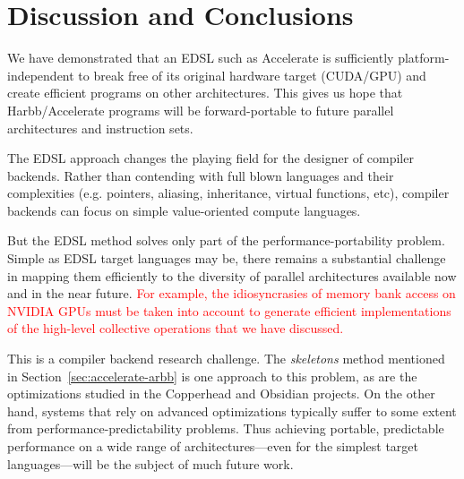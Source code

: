 \documentclass[conference]{IEEEtran}
\newcommand{\textred}[1]{\textcolor{red}{#1}}
\newcommand{\textred}[1]{#1}
\newcommand{\systemname}[0]{{Harbb}}
\newcommand{\accarbb}[0]{\systemname{}}
\begin{document}

\section{Discussion and Conclusions}

We have demonstrated that an EDSL such as Accelerate is sufficiently
platform-independent to break free of its original hardware target
(CUDA/GPU) and create efficient programs on other architectures.  This
gives us hope that \systemname{}/Accelerate programs will be
forward-portable to future parallel architectures and instruction
sets.

The EDSL approach changes the playing field for the designer
of compiler backends.  Rather than contending with full blown
languages and their complexities (e.g. pointers, aliasing,
inheritance, virtual functions, etc), compiler backends can focus on
simple value-oriented compute languages.


But the EDSL method solves only part of the performance-portability problem.
Simple as EDSL target languages may be, there remains a
substantial challenge in mapping them efficiently to the diversity
of parallel architectures available now and in the near future.
\textred{For example, the idiosyncrasies of memory bank access on
  NVIDIA GPUs must be taken into account to generate efficient
  implementations of the high-level collective operations that we have
  discussed.}

This is a compiler backend research challenge.
The {\em skeletons} method mentioned in
Section~\ref{sec:accelerate-arbb} is one approach to this problem, as
are the optimizations studied in the Copperhead \cite{copperhead} and
Obsidian \cite{obsidian} projects.
%
On the other hand, systems that rely on advanced optimizations
typically suffer to some extent from performance-predictability
problems.  Thus achieving portable, predictable performance on a wide range
of architectures---even for the simplest target languages---will
be the subject of much future work.

{
\small
% 


}
\end{document}
